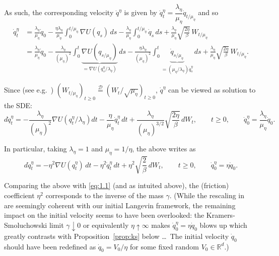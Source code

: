 \documentclass[11pt]{article}
\theoremstyle{remark}
\begin{document}
As such, the corresponding velocity $\dot{q}^{\eta}$ is given by
$\dot{q}_t^{\eta}=\dfrac{\lambda_{\eta}}{\mu_{\eta}}\dot{q}_{t/\mu_{\eta}}$ and so
\[
\begin{aligned}
\dot{q}_t^{\eta}
&= \frac{\lambda_{\eta}}{\mu_{\eta}}\dot{q}_0
- \frac{\eta\lambda_{\eta}}{\mu_{\eta}}\int_0^{t/\mu_{\eta}} \nabla U(q_s)\,ds
- \frac{\lambda_{\eta}}{\mu_{\eta}}\int_0^{t/\mu_{\eta}} \dot{q}_s\,ds
+ \frac{\lambda_{\eta}}{\mu_{\eta}}\sqrt{\frac{2\eta}{\beta}}\,W_{t/\mu_{\eta}} \\
&= \frac{\lambda_{\eta}}{\mu_{\eta}}\dot{q}_0
- \frac{\lambda_{\eta}}{(\mu_{\eta})^2}\int_0^{t} \underbrace{\nabla U(q_{s/\mu_{\eta}})}_{=\nabla U(q_s^{\eta}/\lambda_{\eta})}\,ds
- \frac{\eta\lambda_{\eta}}{(\mu_{\eta})^2}\int_0^{t} \underbrace{\dot{q}_{s/\mu_{\eta}}}_{=(\mu_{\eta}/\lambda_{\eta})\dot{q}_s^{\eta}}\,ds
+ \frac{\lambda_{\eta}}{\mu_{\eta}}\sqrt{\frac{2\eta}{\beta}}\,W_{t/\mu_{\eta}}.
\end{aligned}
\]


Since (see e.g.~\cite{ks91}) $(W_{t/\mu_{\eta}})_{t\ge0}\overset{\mathcal{D}}{=}(W_t/\sqrt{\mu_{\eta}})_{t\ge0}$, $\dot q^{\eta}$ can be viewed as solution to the SDE:
\[
d\dot q_t^{\eta}
=
-\frac{\lambda_{\eta}}{(\mu_{\eta})^2}\nabla U\!\left(q_t^{\eta}/\lambda_{\eta}\right)dt
-\frac{\eta}{\mu_{\eta}}\dot q_t^{\eta}\,dt
+\frac{\lambda_{\eta}}{(\mu_{\eta})^{3/2}}\sqrt{\frac{2\eta}{\beta}}\,dW_t,
\qquad t\ge0,
\qquad
\dot q_0^{\eta}=\frac{\lambda_{\eta}}{\mu_{\eta}}\dot q_0.
\]

In particular, taking $\lambda_{\eta}=1$ and $\mu_{\eta}=1/\eta$, the above writes as
\[
d\dot q_t^{\eta}
=
-\eta^2\nabla U(q_t^{\eta})\,dt-\eta^2\dot q_t^{\eta}\,dt+\eta^2\sqrt{\frac{2}{\beta}}\,dW_t,
\qquad t\ge0,
\qquad
\dot q_0^{\eta}=\eta\dot q_0.
\]

Comparing the above with \eqref{eq:1.1} (and as intuited above), the (friction) coefficient $\eta^2$ corresponds to the inverse of the mass $\gamma$.
(While the rescaling in~\cite{p14} are seemingly coherent with our initial Langevin framework, the remaining impact on the initial velocity seems to have been overlooked: the Kramers-Smoluchowski limit $\gamma\downarrow 0$ or equivalently $\eta\uparrow\infty$ makes $\dot q_0^{\eta}=\eta\dot q_0$ blows up which greatly contrasts with Proposition~\ref{prop:ks} below \dots\ The initial velocity $\dot q_0$ should have been redefined as $\dot q_0=V_0/\eta$ for some fixed random $V_0\in\mathbb{R}^d$.)
\end{document}
